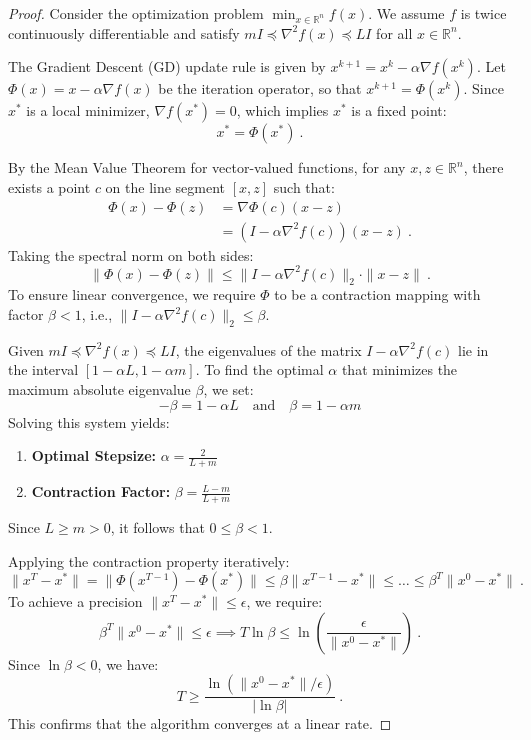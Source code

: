 \begin{proof}
Consider the optimization problem $\min_{x \in \mathbb{R}^n} f(x)$. We assume $f$ is twice continuously differentiable and satisfy $mI \preceq \nabla^2 f(x) \preceq LI$ for all $x \in \mathbb{R}^n$. 

The Gradient Descent (GD) update rule is given by $x^{k+1} = x^k - \alpha \nabla f(x^k)$. Let $\Phi(x) = x - \alpha \nabla f(x)$ be the iteration operator, so that $x^{k+1} = \Phi(x^k)$. 
Since $x^*$ is a local minimizer, $\nabla f(x^*) = 0$, which implies $x^*$ is a fixed point:
$$ x^* = \Phi(x^*) \ . $$

By the Mean Value Theorem for vector-valued functions, for any $x, z \in \mathbb{R}^n$, there exists a point $c$ on the line segment $[x, z]$ such that:
\begin{align*}
\Phi(x) - \Phi(z) &= \nabla \Phi(c)(x - z) \\
&= (I - \alpha \nabla^2 f(c))(x - z) \ .
\end{align*}
Taking the spectral norm on both sides:
$$ \|\Phi(x) - \Phi(z)\| \leq \|I - \alpha \nabla^2 f(c)\|_2 \cdot \|x - z\|  \ .$$
To ensure linear convergence, we require $\Phi$ to be a contraction mapping with factor $\beta < 1$, i.e., $\|I - \alpha \nabla^2 f(c)\|_2 \leq \beta$.

Given $mI \preceq \nabla^2 f(x) \preceq LI$, the eigenvalues of the matrix $I - \alpha \nabla^2 f(c)$ lie in the interval $[1 - \alpha L, 1 - \alpha m]$. To find the optimal $\alpha$ that minimizes the maximum absolute eigenvalue $\beta$, we set:
$$ -\beta = 1 - \alpha L \quad \text{and} \quad \beta = 1 - \alpha m $$
Solving this system yields:
\begin{enumerate}
    \item \textbf{Optimal Stepsize:} $\alpha = \frac{2}{L + m}$
    \item \textbf{Contraction Factor:} $\beta = \frac{L - m}{L + m}$
\end{enumerate}
Since $L \geq m > 0$, it follows that $0 \leq \beta < 1$.

Applying the contraction property iteratively:
$$ \|x^T - x^*\| = \|\Phi(x^{T-1}) - \Phi(x^*)\| \leq \beta \|x^{T-1} - x^*\| \leq \dots \leq \beta^T \|x^0 - x^*\| \ .$$
To achieve a precision $\|x^T - x^*\| \leq \epsilon$, we require:
$$ \beta^T \|x^0 - x^*\| \leq \epsilon \implies T \ln \beta \leq \ln \left( \frac{\epsilon}{\|x^0 - x^*\|} \right) \ .$$
Since $\ln \beta < 0$, we have:
$$ T \geq \frac{\ln (\|x^0 - x^*\| / \epsilon)}{|\ln \beta|} \ .$$
This confirms that the algorithm converges at a linear rate.
\end{proof}

